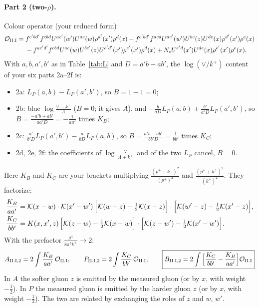\documentclass[10pt]{article}
\numberwithin{equation}{section}
\newcommand{\KK}{\mathcal K}
\newcommand{\kp}{k^+}
\newcommand{\pp}{p^+}
\begin{document}
\paragraph{Part 2 (two-$\rho$).} Colour operator (your reduced form)
\begin{align*}
\mathcal O_{\rm II.I}={}&f^{c'bd'}f^{cbd}U^{ac'}(w')U^{ac}(w)\rho^{d'}(x')\rho^d(x)-f^{c'bd'}f^{acd}U^{ac'}(w')U^{bc}(z)U^{de}(x)\rho^{d'}(x')\rho^e(x)\\
&-f^{ac'd'}f^{cbd}U^{ac}(w)U^{bc'}(z)U^{e'd'}(x')\rho^{e'}(x')\rho^d(x)+N_cU^{e'd}(x')U^{de}(x)\rho^{e'}(x')\rho^e(x).
\end{align*}
With $a,b,a',b'$ as in Table~\ref{tab:L} and $D=a'b-ab'$, the $\log(\vee/k^+)$ content of your six parts 2a--2f is:
\begin{itemize}
\item 2a: $L_P(a,b)-L_P(a',b')$, so $B=1-1=0$;
\item 2b: blue $\log\frac{\vee-k^+}{\Lambda}$ ($B=0$; it gives $A$), and $-\frac{b}{aD}L_P(a,b)+\frac{b'}{a'D}L_P(a',b')$, so $B=\frac{-a'b+ab'}{aa'D}=-\frac{1}{aa'}$ times $K_B$;
\item 2c: $\frac{a'}{b'D}L_P(a',b')-\frac{a}{bD}L_P(a,b)$, so $B=\frac{a'b-ab'}{bb'D}=\frac{1}{bb'}$ times $K_C$;
\item 2d, 2e, 2f: the coefficients of $\log\frac{\vee}{\Lambda+k^+}$ and of the two $L_P$ cancel, $B=0$.
\end{itemize}
Here $K_B$ and $K_C$ are your brackets multiplying $\frac{(\pp+\kp)^2}{(\pp)^2}$ and $\frac{(\pp+\kp)^2}{(\kp)^2}$. They factorize:
\begin{align}
\frac{K_B}{aa'}&=\KK(x-w)\cdot\KK(x'-w')\,\Big[\KK(w-z)-\tfrac12\KK(x-z)\Big]\cdot\Big[\KK(w'-z)-\tfrac12\KK(x'-z)\Big],\notag\\
\frac{K_C}{bb'}&=K(x,x',z)\,\Big[\KK(z-w)-\tfrac12\KK(x-w)\Big]\cdot\Big[\KK(z-w')-\tfrac12\KK(x'-w')\Big].
\end{align}
With the prefactor $\frac{g^4}{8\pi^5k^+}\to2$:
\begin{equation}
A_{\rm II.I,2}=2\int\frac{K_B}{aa'}\,\mathcal O_{\rm II.I},\qquad P_{\rm II.I,2}=2\int\frac{K_C}{bb'}\,\mathcal O_{\rm II.I},\qquad
\boxed{B_{\rm II.I,2}=2\int\Big[\frac{K_C}{bb'}-\frac{K_B}{aa'}\Big]\mathcal O_{\rm II.I}}
\end{equation}
In $A$ the softer gluon $z$ is emitted by the measured gluon (or by $x$, with weight $-\frac12$). In $P$ the measured gluon is emitted by the harder gluon $z$ (or by $x$, with weight $-\frac12$). The two are related by exchanging the roles of $z$ and $w$, $w'$.
\end{document}
